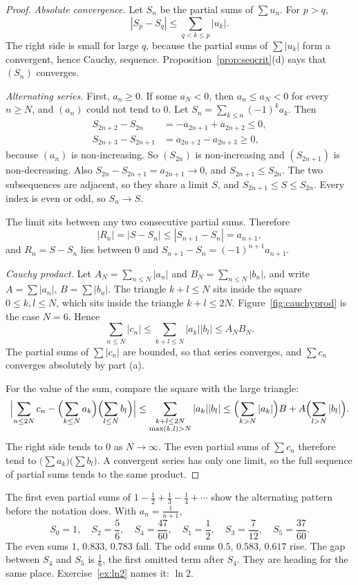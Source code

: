\begin{proof}
\emph{Absolute convergence.} Let $S_n$ be the partial sums of $\sum u_n$. For $p>q$,
\[
|S_p-S_q|\le\sum_{q<k\le p}|u_k|.
\]
The right side is small for large $q$, because the partial sums of $\sum|u_k|$ form a convergent, hence Cauchy, sequence. Proposition~\ref{prop:seqcrit}(d) says that $(S_n)$ converges.

\emph{Alternating series.} First, $a_n\ge0$. If some $a_N<0$, then $a_n\le a_N<0$ for every $n\ge N$, and $(a_n)$ could not tend to $0$. Let $S_n=\sum_{k\le n}(-1)^ka_k$. Then
\begin{align*}
S_{2n+2}-S_{2n}&=-a_{2n+1}+a_{2n+2}\le0,\\
S_{2n+3}-S_{2n+1}&=a_{2n+2}-a_{2n+3}\ge0,
\end{align*}
because $(a_n)$ is non-increasing. So $(S_{2n})$ is non-increasing and $(S_{2n+1})$ is non-decreasing. Also $S_{2n}-S_{2n+1}=a_{2n+1}\to0$, and $S_{2n+1}\le S_{2n}$. The two subsequences are adjacent, so they share a limit $S$, and $S_{2n+1}\le S\le S_{2n}$. Every index is even or odd, so $S_n\to S$.

The limit sits between any two consecutive partial sums. Therefore
\[
|R_n|=|S-S_n|\le|S_{n+1}-S_n|=a_{n+1},
\]
and $R_n=S-S_n$ lies between $0$ and $S_{n+1}-S_n=(-1)^{n+1}a_{n+1}$.

\emph{Cauchy product.} Let $A_N=\sum_{n\le N}|a_n|$ and $B_N=\sum_{n\le N}|b_n|$, and write $A=\sum|a_n|$, $B=\sum|b_n|$. The triangle $k+l\le N$ sits inside the square $0\le k,l\le N$, which sits inside the triangle $k+l\le2N$. Figure~\ref{fig:cauchyprod} is the case $N=6$. Hence
\[
\sum_{n\le N}|c_n|\le\sum_{k+l\le N}|a_k||b_l|\le A_NB_N.
\]
The partial sums of $\sum|c_n|$ are bounded, so that series converges, and $\sum c_n$ converges absolutely by part (a).

For the value of the sum, compare the square with the large triangle:
\[
\Bigl|\sum_{n\le2N}c_n-\Bigl(\sum_{k\le N}a_k\Bigr)\Bigl(\sum_{l\le N}b_l\Bigr)\Bigr|
\le\sum_{\substack{k+l\le2N\\ \max(k,l)>N}}|a_k||b_l|
\le\Bigl(\sum_{k>N}|a_k|\Bigr)B+A\Bigl(\sum_{l>N}|b_l|\Bigr).
\]
The right side tends to $0$ as $N\to\infty$. The even partial sums of $\sum c_n$ therefore tend to $\bigl(\sum a_k\bigr)\bigl(\sum b_l\bigr)$. A convergent series has only one limit, so the full sequence of partial sums tends to the same product.
\end{proof}

The first even partial sums of $1-\frac12+\frac13-\frac14+\cdots$ show the alternating pattern before the notation does. With $a_n=\frac1{n+1}$,
\[
S_0=1,\quad S_2=\frac56,\quad S_4=\frac{47}{60},\quad S_1=\frac12,\quad S_3=\frac7{12},\quad S_5=\frac{37}{60}.
\]
The even sums $1$, $0.833$, $0.783$ fall. The odd sums $0.5$, $0.583$, $0.617$ rise. The gap between $S_4$ and $S_5$ is $\frac1{6}$, the first omitted term after $S_4$. They are heading for the same place. Exercise~\ref{ex:ln2} names it: $\ln2$.

